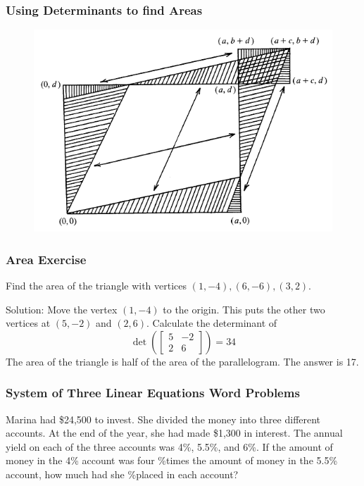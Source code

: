 \documentclass[xcolor=dvipsnames]{beamer}
\begin{document}
\begin{frame}
  \frametitle{Using Determinants to find Areas}
    \begin{figure}[h]
    \includegraphics[scale=.5]{./diagrams/pardet1.png}
  \end{figure}
\end{frame}

\begin{frame}
  \frametitle{Area Exercise}
  {\ubung} Find the area of the triangle with vertices
  $(1,-4),(6,-6),(3,2)$.

  \medskip

  Solution: Move the vertex $(1,-4)$ to the origin. This puts the
  other two vertices at $(5,-2)$ and $(2,6)$. Calculate the
  determinant of
  \begin{equation}
    \label{eq:shuajohs}
    \det\left(\left[
      \begin{array}{cc}
        5 & -2 \\
        2 & 6
      \end{array}\right]\right)=34
  \end{equation}
The area of the triangle is half of the area of the parallelogram. The
answer is 17. 
\end{frame}


\begin{frame}
  \frametitle{System of Three Linear Equations Word Problems}
  {\ubung} Marina had \$24,500 to invest. She divided the money into
  three different accounts. At the end of the year, she had made
  \$1,300 in interest. The annual yield on each of the three accounts
  was 4\%, 5.5\%, and 6\%. If the amount of money in the 4\% account
  was four \%times the amount of money in the 5.5\% account, how much
  had she \%placed in each account?
\end{frame}
\end{document}
